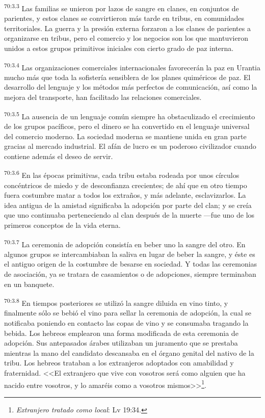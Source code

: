 \documentclass[twoside, 11pt]{book}
\begin{document}
\par
\textsuperscript{70:3.3} Las familias se unieron por lazos de sangre en clanes, en conjuntos de parientes, y estos clanes se convirtieron más tarde en tribus, en comunidades territoriales. La guerra y la presión externa forzaron a los clanes de parientes a organizarse en tribus, pero el comercio y los negocios son los que mantuvieron unidos a estos grupos primitivos iniciales con cierto grado de paz interna.

\par
\textsuperscript{70:3.4} Las organizaciones comerciales internacionales favorecerán la paz en Urantia mucho más que toda la sofistería sensiblera de los planes quiméricos de paz. El desarrollo del lenguaje y los métodos más perfectos de comunicación, así como la mejora del transporte, han facilitado las relaciones comerciales.

\par
\textsuperscript{70:3.5} La ausencia de un lenguaje común siempre ha obstaculizado el crecimiento de los grupos pacíficos, pero el dinero se ha convertido en el lenguaje universal del comercio moderno. La sociedad moderna se mantiene unida en gran parte gracias al mercado industrial. El afán de lucro es un poderoso civilizador cuando contiene además el deseo de servir.

\par
\textsuperscript{70:3.6} En las épocas primitivas, cada tribu estaba rodeada por unos círculos concéntricos de miedo y de desconfianza crecientes; de ahí que en otro tiempo fuera costumbre matar a todos los extraños, y más adelante, esclavizarlos. La idea antigua de la amistad significaba la adopción por parte del clan; y se creía que uno continuaba perteneciendo al clan después de la muerte ---fue uno de los primeros conceptos de la vida eterna.

\par
\textsuperscript{70:3.7} La ceremonia de adopción consistía en beber uno la sangre del otro. En algunos grupos se intercambiaban la saliva en lugar de beber la sangre, y éste es el antiguo origen de la costumbre de besarse en sociedad. Y todas las ceremonias de asociación, ya se tratara de casamientos o de adopciones, siempre terminaban en un banquete.

\par
\textsuperscript{70:3.8} En tiempos posteriores se utilizó la sangre diluida en vino tinto, y finalmente sólo se bebió el vino para sellar la ceremonia de adopción, la cual se notificaba poniendo en contacto las copas de vino y se consumaba tragando la bebida. Los hebreos emplearon una forma modificada de esta ceremonia de adopción. Sus antepasados árabes utilizaban un juramento que se prestaba mientras la mano del candidato descansaba en el órgano genital del nativo de la tribu. Los hebreos trataban a los extranjeros adoptados con amabilidad y fraternidad. <<El extranjero que vive con vosotros será como alguien que ha nacido entre vosotros, y lo amaréis como a vosotros mismos>>\footnote{\textit{Extranjero tratado como local}: Lv 19:34.}.
\end{document}
